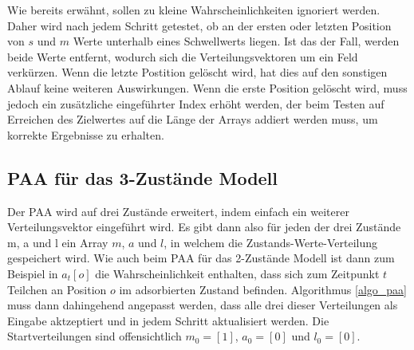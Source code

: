 Wie bereits erwähnt, sollen zu kleine Wahrscheinlichkeiten ignoriert werden. Daher wird nach jedem Schritt getestet, ob an der ersten oder letzten Position von $s$ und $m$ Werte unterhalb eines Schwellwerts liegen. Ist das der Fall, werden beide Werte entfernt, wodurch sich die Verteilungsvektoren um ein Feld verkürzen. Wenn die letzte Postition gelöscht wird, hat dies auf den sonstigen Ablauf keine weiteren Auswirkungen. Wenn die erste Position gelöscht wird, muss jedoch ein zusätzliche eingeführter Index erhöht werden, der beim Testen auf Erreichen des Zielwertes auf die Länge der Arrays addiert werden muss, um korrekte Ergebnisse zu erhalten.
% 
% 

\subsection{PAA für das 3-Zustände Modell}

Der PAA wird auf drei Zustände erweitert, indem einfach ein weiterer Verteilungsvektor eingeführt wird. Es gibt dann also für jeden der drei Zustände m, a und l ein Array $m$, $a$ und $l$, in welchem die Zustands-Werte-Verteilung gespeichert wird. Wie auch beim PAA für das 2-Zustände Modell ist dann zum Beispiel in $a_t[o]$ die Wahrscheinlichkeit enthalten, dass sich zum Zeitpunkt $t$ Teilchen an Position $o$ im adsorbierten Zustand befinden.
Algorithmus \ref{algo_paa} muss dann dahingehend angepasst werden, dass alle drei dieser Verteilungen als Eingabe aktzeptiert und in jedem Schritt aktualisiert werden.
Die Startverteilungen sind offensichtlich $m_0 = [1]$, $a_0 = [0]$ und $l_0=[0]$. 

